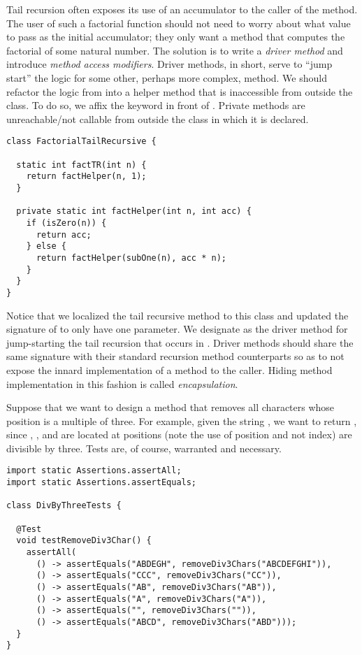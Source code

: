 Tail recursion often exposes its use of an accumulator to the caller of the method. 
The user of such a factorial function should not need to worry about what value to pass as the initial accumulator; they only want a method that computes the factorial of some natural number. 
The solution is to write a \emph{driver method} and introduce \emph{method access modifiers}. 
Driver methods, in short, serve to ``jump start'' the logic for some other, perhaps more complex, method. 
We should refactor the logic from  into a helper method that is inaccessible from outside the class. 
To do so, we affix the  keyword in front of . 
Private methods are unreachable/not callable from outside the class in which it is declared.

\begin{lstlisting}[language=MyJava]
class FactorialTailRecursive {
  
  static int factTR(int n) {
    return factHelper(n, 1);
  }

  private static int factHelper(int n, int acc) {
    if (isZero(n)) {
      return acc;
    } else {
      return factHelper(subOne(n), acc * n);
    }
  }
}
\end{lstlisting}

Notice that we localized the tail recursive method to this class and updated the signature of  to only have one parameter. 
We designate  as the driver method for jump-starting the tail recursion that occurs in . 
Driver methods should share the same signature with their standard recursion method counterparts so as to not expose the innard implementation of a method to the caller. 
Hiding method implementation in this fashion is called \emph{encapsulation}. 

Suppose that we want to design a method that removes all characters whose position is a multiple of three. 
For example, given the string , we want to return , since , , and  are located at positions (note the use of position and not index) are divisible by three. 
Tests are, of course, warranted and necessary.

\begin{lstlisting}[language=MyJava]
import static Assertions.assertAll;
import static Assertions.assertEquals;

class DivByThreeTests {

  @Test
  void testRemoveDiv3Char() {
    assertAll(
      () -> assertEquals("ABDEGH", removeDiv3Chars("ABCDEFGHI")),
      () -> assertEquals("CCC", removeDiv3Chars("CC")),
      () -> assertEquals("AB", removeDiv3Chars("AB")),
      () -> assertEquals("A", removeDiv3Chars("A")),
      () -> assertEquals("", removeDiv3Chars("")),
      () -> assertEquals("ABCD", removeDiv3Chars("ABD")));
  }
}
\end{lstlisting}

